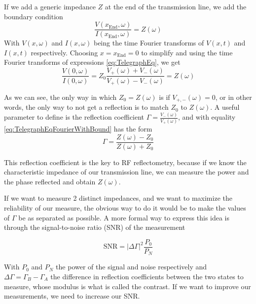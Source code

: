\documentclass[../main.tex]{subfiles}
\begin{document}
If we add a generic impedance \(Z\) at the end of the transmission line, we
add the boundary condition
\begin{equation*}
\label{eq:RfBoundCond}
    \frac{V(x_{\text{End}},\omega)}{I(x_{\text{End}},\omega)} = Z(\omega)
\end{equation*}
With \(V(x,\omega)\) and \(I(x,\omega)\) being the time Fourier transforms of
\(V(x,t)\) and \(I(x,t)\) respectively. Choosing \(x=x_{\text{End}}=0\) to
simplify and using the time Fourier transforms of expressions
\ref{eq:TelegraphEq}, we get
\begin{equation}
\label{eq:TelegraphEqFourierWithBound}
    \frac{V(0,\omega)}{I(0,\omega)} =
    Z_{0}\frac{V_{+}(\omega) + V_{-}(\omega)}
    {V_{+}(\omega) - V_{-}(\omega)} = Z(\omega)
\end{equation}

As we can see, the only way in which \(Z_{0} = Z(\omega)\) is if
\(V_{+,-}(\omega)=0\), or in other words, the only way to not get a reflection
is to match \(Z_{0}\) to \(Z(\omega)\). A useful parameter to define is the
reflection coefficient \(\Gamma = \frac{V_{-}(\omega)}{V_{+}(\omega)}\), and
with equality \ref{eq:TelegraphEqFourierWithBound} has the form
\begin{equation}
\label{eq:ReflecCoeff}
    \Gamma = \frac{Z(\omega) - Z_{0}}{Z(\omega) + Z_{0}}
\end{equation}

This reflection coefficient is the key to RF reflectometry, because if we
know the characteristic impedance of our transmission line, we can measure
the power and the phase reflected and obtain \(Z(\omega)\).

If we want to measure 2 distinct impedances, and we want to maximize the
reliability of our measure, the obvious way to do it would be to make the values
of \(\Gamma\) be as separated as possible. A more formal way to express this
idea is through the signal-to-noise ratio (SNR) of the measurement

\begin{equation}
\label{eq:SNR}
\text{SNR} = |\Delta\Gamma|^2\frac{P_{0}}{P_{N}}
\end{equation}

With \(P_{0}\) and \(P_{N}\) the power of the signal and noise respectively and
\(\Delta\Gamma = \Gamma_{B} - \Gamma_{A}\) the difference in reflection
coefficients between the two states to measure, whose modulus is what is
called the contrast. If we want to improve our measurements, we need to
increase our SNR.
\end{document}
